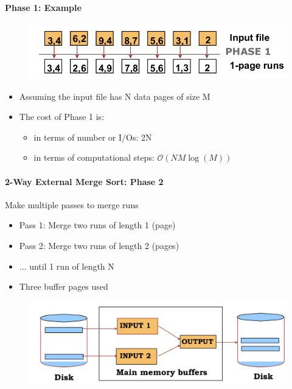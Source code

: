 \paragraph{Phase 1: Example}
\begin{figure}[h]
  \begin{minipage}{1.0\linewidth}
    \begin{center}
      \includegraphics[scale=0.2]{graphics/phase1-ex}
    \end{center}
  \end{minipage}
\end{figure}
\begin{itemize}
\item Assuming the input file has N data pages of size M
\item The cost of Phase 1 is:
  \begin{itemize}
  \item in terms of number or I/Os: 2N
  \item in terms of computational steps: $\mathcal{O}(N M \log(M))$
  \end{itemize}
\end{itemize}


\paragraph{2-Way External Merge Sort: Phase 2}
Make multiple passes to merge runs
\begin{itemize}
\item Pass 1: Merge two runs of length 1 (page)
\item Pass 2: Merge two runs of length 2 (pages)
\item ... until 1 run of length N
\item Three buffer pages used
\end{itemize}

\begin{figure}[h]
  \begin{minipage}{1.0\linewidth}
    \begin{center}
      \includegraphics[scale=0.18]{graphics/phase2}
    \end{center}
  \end{minipage}
\end{figure}



